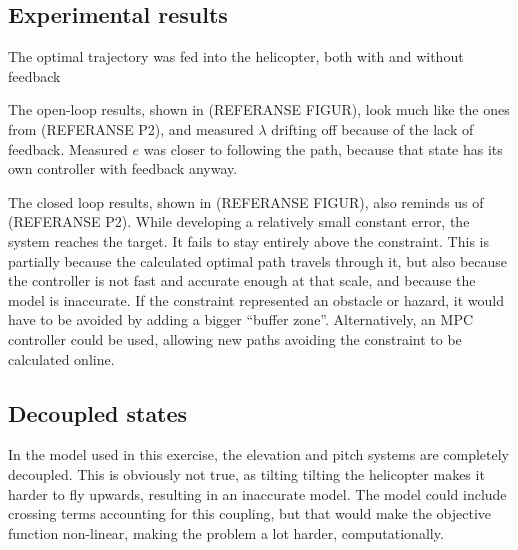 \subsection{Experimental results}
The optimal trajectory was fed into the helicopter, both with and without feedback

The open-loop results, shown in (REFERANSE FIGUR), look much like the ones from (REFERANSE P2), and measured $\lambda$ drifting off because of the lack of feedback. Measured $e$ was closer to following the path, because that state has its own controller with feedback anyway.

The closed loop results, shown in (REFERANSE FIGUR), also reminds us of (REFERANSE P2). While developing a relatively small constant error, the system reaches the target. It fails to stay entirely above the constraint. This is partially because the calculated optimal path travels through it, but also because the controller is not fast and accurate enough at that scale, and because the model is inaccurate. If the constraint represented an obstacle or hazard, it would have to be avoided by adding a bigger ``buffer zone''. Alternatively, an MPC controller could be used, allowing new paths avoiding the constraint to be calculated online.

\subsection{Decoupled states}
In the model used in this exercise, the elevation and pitch systems are completely decoupled. This is obviously not true, as tilting tilting the helicopter makes it harder to fly upwards, resulting in an inaccurate model. The model could include crossing terms accounting for this coupling, but that would make the objective function non-linear, making the problem a lot harder, computationally.
